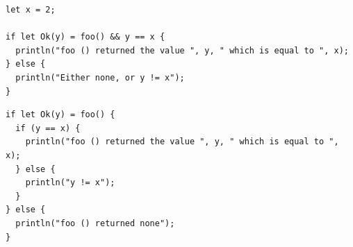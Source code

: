 

\begin{lstlisting}[style=coloredverbatim, caption=Using a pattern guard]
let x = 2;

if let Ok(y) = foo() && y == x {
  println("foo () returned the value ", y, " which is equal to ", x);
} else {
  println("Either none, or y != x");
}
\end{lstlisting}

\begin{lstlisting}[style=coloredverbatim, caption=Using a second condition instead of pattern guard, label=lst:(chap7):using_second_cond_no_guard]
if let Ok(y) = foo() {
  if (y == x) {
    println("foo () returned the value ", y, " which is equal to ", x);
  } else {
    println("y != x");
  }
} else {
  println("foo () returned none");
}
\end{lstlisting}

\vfill%
\pagebreak
